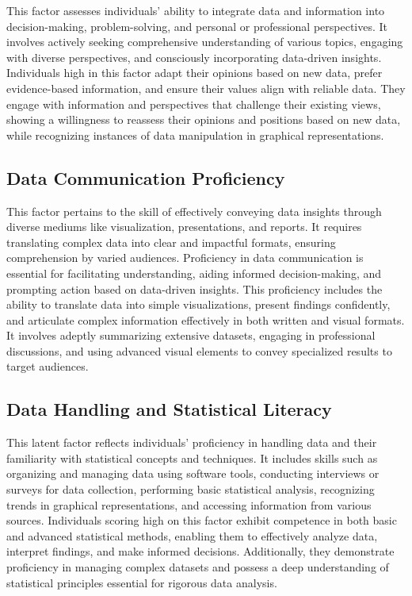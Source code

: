 \documentclass[
  12pt,
  a4paper,
  twoside]{article}
\begin{document}
This factor assesses individuals' ability to integrate data and information into decision-making, problem-solving, and personal or professional perspectives. It involves actively seeking comprehensive understanding of various topics, engaging with diverse perspectives, and consciously incorporating data-driven insights. Individuals high in this factor adapt their opinions based on new data, prefer evidence-based information, and ensure their values align with reliable data. They engage with information and perspectives that challenge their existing views, showing a willingness to reassess their opinions and positions based on new data, while recognizing instances of data manipulation in graphical representations.

\hypertarget{data-communication-proficiency}{%
\subsection{Data Communication Proficiency}\label{data-communication-proficiency}}

This factor pertains to the skill of effectively conveying data insights through diverse mediums like visualization, presentations, and reports. It requires translating complex data into clear and impactful formats, ensuring comprehension by varied audiences. Proficiency in data communication is essential for facilitating understanding, aiding informed decision-making, and prompting action based on data-driven insights. This proficiency includes the ability to translate data into simple visualizations, present findings confidently, and articulate complex information effectively in both written and visual formats. It involves adeptly summarizing extensive datasets, engaging in professional discussions, and using advanced visual elements to convey specialized results to target audiences.

\hypertarget{data-handling-and-statistical-literacy}{%
\subsection{Data Handling and Statistical Literacy}\label{data-handling-and-statistical-literacy}}

This latent factor reflects individuals' proficiency in handling data and their familiarity with statistical concepts and techniques. It includes skills such as organizing and managing data using software tools, conducting interviews or surveys for data collection, performing basic statistical analysis, recognizing trends in graphical representations, and accessing information from various sources. Individuals scoring high on this factor exhibit competence in both basic and advanced statistical methods, enabling them to effectively analyze data, interpret findings, and make informed decisions. Additionally, they demonstrate proficiency in managing complex datasets and possess a deep understanding of statistical principles essential for rigorous data analysis.
\end{document}
